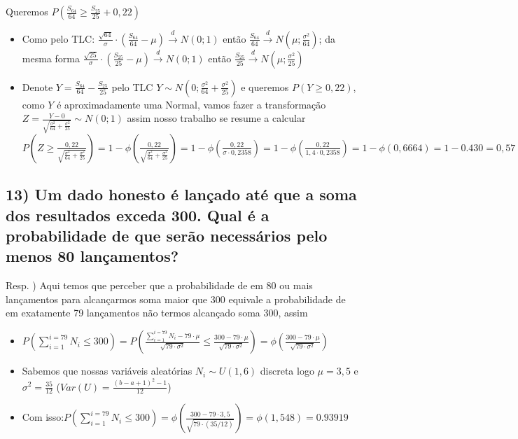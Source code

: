 \documentclass[english]{article}
\begin{document}
Queremos $P(\frac{S_{64}}{64}\ge\frac{S_{25}}{25}+0,22)$
\begin{itemize}
\item Como pelo TLC: $\frac{\sqrt{64}}{\sigma}\cdot(\frac{S_{64}}{64}-\mu)\overset{d}{\to}N(0;1)$
então $\frac{S_{64}}{64}\overset{d}{\to}N(\mu;\frac{\sigma^{2}}{64})$;
da mesma forma $\frac{\sqrt{25}}{\sigma}\cdot(\frac{S_{25}}{25}-\mu)\overset{d}{\to}N(0;1)$
então $\frac{S_{25}}{25}\overset{d}{\to}N(\mu;\frac{\sigma^{2}}{25})$
\item Denote $Y=\frac{S_{64}}{64}-\frac{S_{25}}{25}$ pelo TLC $Y\sim N(0;\frac{\sigma^{2}}{64}+\frac{\sigma^{2}}{25})$
e queremos $P(Y\ge0,22)$, como $Y$ é aproximadamente uma Normal,
vamos fazer a transformação $Z=\frac{Y-0}{\sqrt{\frac{\sigma^{2}}{64}+\frac{\sigma^{2}}{25}}}\sim N(0;1)$
assim nosso trabalho se resume a calcular $P(Z\ge\frac{0,22}{\sqrt{\frac{\sigma^{2}}{64}+\frac{\sigma^{2}}{25}}})=1-\phi(\frac{0,22}{\sqrt{\frac{\sigma^{2}}{64}+\frac{\sigma^{2}}{25}}})=1-\phi(\frac{0,22}{\sigma\cdot0,2358})=1-\phi(\frac{0,22}{1,4\cdot0,2358})=1-\phi(0,6664)=1-0.430=0,57$
\end{itemize}

\subsection*{\textcompwordmark{}}


\subsection*{\textmd{13) Um dado honesto é lançado até que a soma dos resultados
exceda 300. Qual é a probabilidade de que serão necessários pelo menos
80 lançamentos?}}

Resp. ) Aqui temos que perceber que a probabilidade de em 80 ou mais
lançamentos para alcançarmos soma maior que 300 equivale a probabilidade
de em exatamente 79 lançamentos não termos alcançado soma 300, assim
\begin{itemize}
\item $P(\sum_{i=1}^{i=79}N_{i}\le300)=P(\frac{\sum_{i=1}^{i=79}N_{i}-79\cdot\mu}{\sqrt{79\cdot\sigma^{2}}}\le\frac{300-79\cdot\mu}{\sqrt{79\cdot\sigma^{2}}})=\phi(\frac{300-79\cdot\mu}{\sqrt{79\cdot\sigma^{2}}})$
\item Sabemos que nossas variáveis aleatórias $N_{i}\sim U(1,6)$ discreta
logo $\mu=3,5$ e $\sigma^{2}=\frac{35}{12}$ ($Var(U)=\frac{(b-a+1)^{2}-1}{12}$)
\item Com isso:$P(\sum_{i=1}^{i=79}N_{i}\le300)=\phi(\frac{300-79\cdot3,5}{\sqrt{79\cdot(35/12)}})=\phi(1,548)=0.93919$
\end{itemize}
\end{document}
